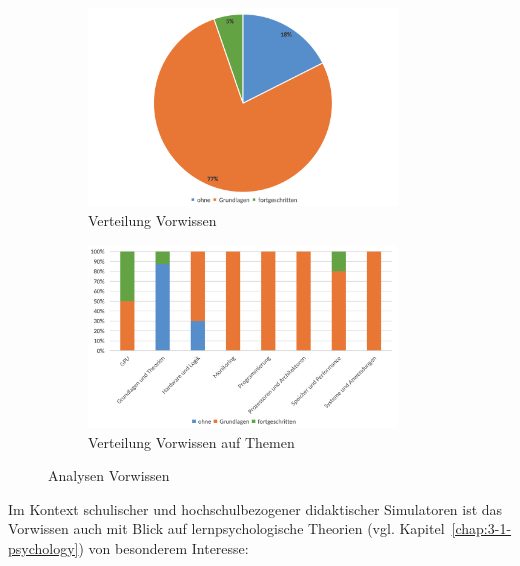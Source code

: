 \begin{figure}[!htbp]
    \centering
    \begin{subfigure}[b]{0.48\textwidth}
        \centering
        \includegraphics[width=0.90\textwidth]{graphics_sim/10-vorwissen.png}
        \caption{Verteilung Vorwissen}
        \label{fig:10-vorwissen}
    \end{subfigure}
    \hfill
    \begin{subfigure}[b]{0.48\textwidth}
        \centering
        \includegraphics[width=0.90\textwidth]{graphics_sim/11-vorwissen-thema.png}
        \caption{Verteilung Vorwissen auf Themen}
        \label{fig:11-vorwissen-thema}
    \end{subfigure}
    \caption{Analysen Vorwissen}
    \label{fig:vorwissen-gesamt}
\end{figure}

Im Kontext schulischer und hochschulbezogener didaktischer Simulatoren ist das Vorwissen auch mit Blick auf lernpsychologische Theorien (vgl. Kapitel~\ref{chap:3-1-psychology}) von besonderem Interesse:

